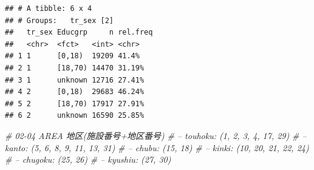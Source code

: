 \documentclass[]{article}
\newenvironment{Shaded}{\begin{snugshade}}{\end{snugshade}}
\newcommand{\CommentTok}[1]{\textcolor[rgb]{0.56,0.35,0.01}{\textit{#1}}}
\begin{document}
\begin{verbatim}
## # A tibble: 6 x 4
## # Groups:   tr_sex [2]
##   tr_sex Educgrp     n rel.freq
##   <chr>  <fct>   <int> <chr>   
## 1 1      [0,18)  19209 41.4%   
## 2 1      [18,70) 14470 31.19%  
## 3 1      unknown 12716 27.41%  
## 4 2      [0,18)  29683 46.24%  
## 5 2      [18,70) 17917 27.91%  
## 6 2      unknown 16590 25.85%
\end{verbatim}

\begin{Shaded}
\begin{Highlighting}[]
\CommentTok{# 02-04 AREA 地区(施設番号+地区番号)}
\CommentTok{# – touhoku: (1, 2, 3, 4, 17, 29)}
\CommentTok{# – kanto: (5, 6, 8, 9, 11, 13, 31)}
\CommentTok{# – chubu: (15, 18)}
\CommentTok{# – kinki: (10, 20, 21, 22, 24)}
\CommentTok{# – chugoku: (25, 26)}
\CommentTok{# – kyushiu: (27, 30)}


\end{Highlighting}
\end{Shaded}
\end{document}
